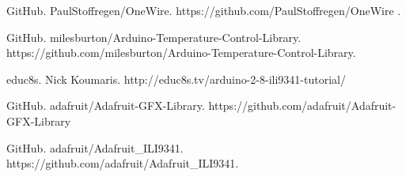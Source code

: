 \begin{thebibliography}{9}
GitHub. PaulStoffregen/OneWire. https://github.com/PaulStoffregen/OneWire .

GitHub. milesburton/Arduino-Temperature-Control-Library. https://github.com/milesburton/Arduino-Temperature-Control-Library.

educ8s. Nick Koumaris.
http://educ8s.tv/arduino-2-8-ili9341-tutorial/

GitHub. adafruit/Adafruit-GFX-Library.  https://github.com/adafruit/Adafruit-GFX-Library

GitHub. adafruit/Adafruit\_ILI9341. https://github.com/adafruit/Adafruit\_ILI9341.

\end{thebibliography}